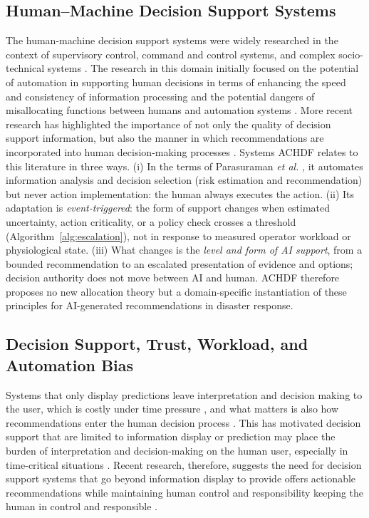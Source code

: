 \documentclass[journal]{IEEEtran}
\theoremstyle{plain}
\theoremstyle{definition}
\providecommand{\DIFaddtex}[1]{{\protect\color{blue} \sf #1}} %
\providecommand{\DIFdeltex}[1]{{\protect\color{red} \scriptsize #1}} %
\providecommand{\DIFaddbegin}{} %
\providecommand{\DIFaddend}{} %
\providecommand{\DIFdelbegin}{} %
\providecommand{\DIFdelend}{} %
\providecommand{\DIFadd}[1]{\texorpdfstring{\DIFaddtex{#1}}{#1}} %
\providecommand{\DIFdel}[1]{\texorpdfstring{\DIFdeltex{#1}}{}} %
\newcommand{\DIFscaledelfig}{0.5}
\newlength{\DIFdelgraphicswidth} %
\newlength{\DIFdelgraphicsheight} %
\newcommand{\DIFaddincludegraphics}[2][]{{\color{blue}\fbox{\DIFOincludegraphics[#1]{#2}}}} %
\newcommand{\DIFdelincludegraphics}[2][]{%
\sbox{\DIFdelgraphicsbox}{\DIFOincludegraphics[#1]{#2}}%
\settoboxwidth{\DIFdelgraphicswidth}{\DIFdelgraphicsbox} %
\settoboxtotalheight{\DIFdelgraphicsheight}{\DIFdelgraphicsbox} %
\scalebox{\DIFscaledelfig}{%
\parbox[b]{\DIFdelgraphicswidth}{\usebox{\DIFdelgraphicsbox}\\[-\baselineskip] \rule{\DIFdelgraphicswidth}{0em}}\llap{\resizebox{\DIFdelgraphicswidth}{\DIFdelgraphicsheight}{%
\setlength{\unitlength}{\DIFdelgraphicswidth}%
\begin{picture}(1,1)%
\thicklines\linethickness{2pt} %
{\color[rgb]{1,0,0}\put(0,0){\framebox(1,1){}}}%
{\color[rgb]{1,0,0}\put(0,0){\line( 1,1){1}}}%
{\color[rgb]{1,0,0}\put(0,1){\line(1,-1){1}}}%
\end{picture}%
}\hspace*{3pt}}} %
} %
\DeclareRobustCommand{\DIFaddbegin}{\DIFOaddbegin \let\includegraphics\DIFaddincludegraphics} %
\DeclareRobustCommand{\DIFaddend}{\DIFOaddend \let\includegraphics\DIFOincludegraphics} %
\DeclareRobustCommand{\DIFdelbegin}{\DIFOdelbegin \let\includegraphics\DIFdelincludegraphics} %
\DeclareRobustCommand{\DIFdelend}{\DIFOaddend \let\includegraphics\DIFOincludegraphics} %
\begin{document}
\DIFdelbegin \subsection{\DIFdel{Human--Machine Decision Support Systems}}
\addtocounter{subsection}{-1}%
\DIFdel{The human-machine decision support systems were widely researched in the context of supervisory control, command and control systems, and complex socio-technical systems \cite{Hodgson2013THMS,Yang2022THMSReview,Bach2024Access}. The research in this domain initially focused on the potential of automation in supporting human decisions in terms of enhancing the speed and consistency of information processing and the potential dangers of misallocating functions between humans and automation systems \cite{Hodgson2013THMS,Zhang2022THMS}. More recent research has highlighted the importance of not only the quality of decision support information, but also the manner in which recommendations are incorporated into human decision-making processes \cite{Lai2023FAccT,Muller2022CHIWORK}.
Systems }\DIFdelend \DIFaddbegin \DIFadd{ACHDF relates to this literature in three ways. (i) In the terms of Parasuraman \emph{et al.} \cite{Parasuraman2000LOA}, it automates information analysis and decision selection (risk estimation and recommendation) but never action implementation: the human always executes the action. (ii) Its adaptation is \emph{event-triggered}: the form of support changes when estimated uncertainty, action criticality, or a policy check crosses a threshold (Algorithm~\ref{alg:escalation}), not in response to measured operator workload or physiological state. (iii) What changes is the \emph{level and form of AI support}, from a bounded recommendation to an escalated presentation of evidence and options; decision authority does not move between AI and human. ACHDF therefore proposes no new allocation theory but a domain-specific instantiation of these principles for AI-generated recommendations in disaster response.
}

\subsection{\DIFadd{Decision Support, Trust, Workload, and Automation Bias}}
\DIFadd{Systems that only display predictions leave interpretation and decision making to the user, which is costly under time pressure \cite{Bach2024Access,PerezCerrolaza2024CSUR}, and what matters is also how recommendations enter the human decision process \cite{Lai2023FAccT,Muller2022CHIWORK,Hodgson2013THMS}. This has motivated decision support }\DIFaddend that \DIFdelbegin \DIFdel{are limited to information display or prediction may place the burden of interpretation and decision-making on the human user, especially in time-critical situations \cite{Bach2024Access,PerezCerrolaza2024CSUR}. Recent research, therefore, suggests the need for decision support systems that go beyond information display to provide }\DIFdelend \DIFaddbegin \DIFadd{offers }\DIFaddend actionable recommendations while \DIFdelbegin \DIFdel{maintaining human control and responsibility }\DIFdelend \DIFaddbegin \DIFadd{keeping the human in control and responsible }\DIFaddend \cite{Assaad2023TAS,Yang2022THMSReview}.
\end{document}
